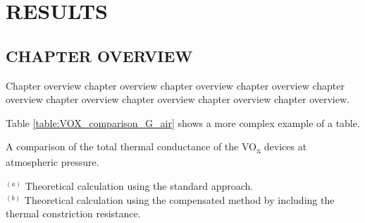 
\chapter{RESULTS}

\section{CHAPTER OVERVIEW}

Chapter overview chapter overview chapter overview chapter overview
chapter overview chapter overview chapter overview chapter overview
chapter overview.

Table \ref{table:VOX_comparison_G_air} shows a more complex example of a table.

\begin{table}[htb!]
\caption{A comparison of the total thermal conductance of the VO\textsubscript{x} devices at atmospheric pressure.}
\label{table:VOX_comparison_G_air}
\begin{center}
\small
\tabcolsep=0.13cm
\end{center}
$^{(a)}$ Theoretical calculation using the standard approach.\\
$^{(b)}$ Theoretical calculation using the compensated method by including the thermal constriction resistance.
\end{table}



